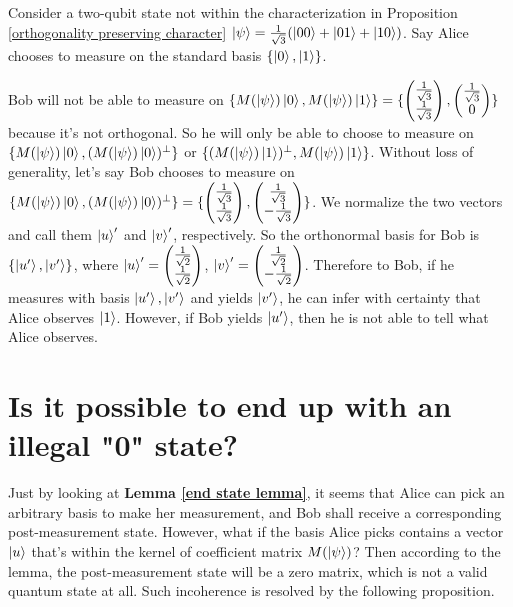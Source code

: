 \begin{example}
Consider a two-qubit state not within the characterization in Proposition \ref{orthogonality preserving character} $\ket{\psi}=\frac{1}{\sqrt{3}}(\ket{00}+\ket{01}+\ket{10})$. Say Alice chooses to measure on the standard basis $\{\ket{0}, \ket{1}\}$.
\end{example}
Bob will not be able to measure on $\{M(\ket{\psi})\ket{0}, M(\ket{\psi})\ket{1}\}=\{\begin{pmatrix}
\frac{1}{\sqrt{3}}\\
\frac{1}{\sqrt{3}}
\end{pmatrix},\begin{pmatrix}
\frac{1}{\sqrt{3}}\\
0
\end{pmatrix}\}$ because it's not orthogonal. So he will only be able to choose to measure on $\{M(\ket{\psi})\ket{0}, (M(\ket{\psi})\ket{0})^\perp \}$ or $\{(M(\ket{\psi})\ket{1})^\perp, M(\ket{\psi})\ket{1} \}$.
Without loss of generality, let's say Bob chooses to measure on $\{M(\ket{\psi})\ket{0}, (M(\ket{\psi})\ket{0})^\perp \}=\{\begin{pmatrix}
\frac{1}{\sqrt{3}}\\
\frac{1}{\sqrt{3}}
\end{pmatrix}, \begin{pmatrix}
\frac{1}{\sqrt{3}}\\
-\frac{1}{\sqrt{3}}
\end{pmatrix}\}$.
We normalize the two vectors and call them $\ket{u}'$ and $\ket{v}'$, respectively. So the orthonormal basis for Bob is $\{\ket{u'}, \ket{v'}\}$, where $\ket{u}'=\begin{pmatrix}
\frac{1}{\sqrt{2}}\\
\frac{1}{\sqrt{2}}
\end{pmatrix}$, $\ket{v}'=\begin{pmatrix}
\frac{1}{\sqrt{2}}\\
-\frac{1}{\sqrt{2}}
\end{pmatrix}$. Therefore to Bob, if he measures with basis $\ket{u'}, \ket{v'}$ and yields $\ket{v'}$, he can infer with certainty that Alice observes $\ket{1}$. However, if Bob yields $\ket{u'}$, then he is not able to tell what Alice observes.


\section{Is it possible to end up with an illegal "0" state?}
Just by looking at \textbf{Lemma \ref{end state lemma}}, it seems that Alice can pick an arbitrary basis to make her measurement, and Bob shall receive a corresponding post-measurement state. However, what if the basis Alice picks contains a vector $\ket{u}$ that's within the kernel of coefficient matrix $M(\ket{\psi})$? Then according to the lemma, the post-measurement state will be a zero matrix, which is not a valid quantum state at all. Such incoherence is resolved by the following proposition.

